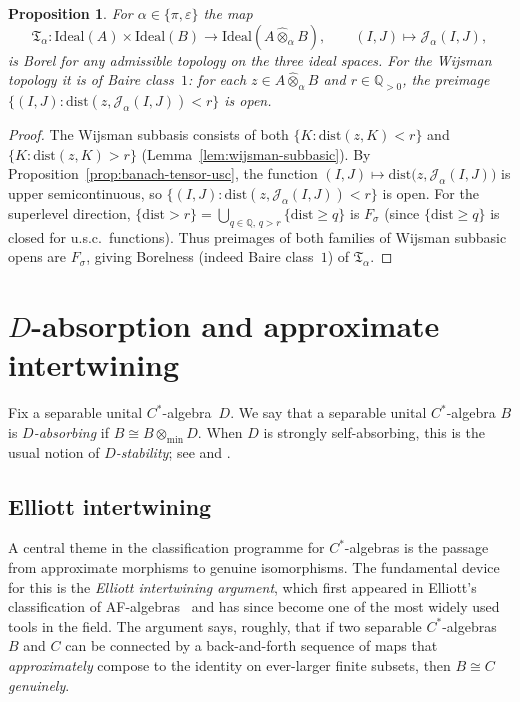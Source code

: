 \documentclass[12pt,fleqn,a4paper]{amsart}
\renewcommand{\ge}{\geqslant}
\numberwithin{equation}{section}
\newtheorem{proposition}[theorem]{Proposition}
\theoremstyle{definition}
\newcommand{\Q}{\mathbb{Q}}
\newcommand{\Ideal}{\mathrm{Ideal}}
\newcommand{\dist}{\mathrm{dist}}
\begin{document}
\begin{proposition}\label{prop:banach-tensor-borel}
For $\alpha\in\{\pi,\varepsilon\}$ the map
\[
\mathfrak T_\alpha:\Ideal(A)\times\Ideal(B)\to \Ideal(A\widehat\otimes_\alpha B),
\qquad (I,J)\mapsto \mathcal J_\alpha(I,J),
\]
is Borel for any admissible topology on the three ideal spaces.
For the Wijsman topology it is of Baire class~$1$:
for each $z\in A\widehat\otimes_\alpha B$ and $r\in\Q_{>0}$, the preimage
$\{(I,J):\dist(z,\mathcal J_\alpha(I,J))<r\}$ is open.
\end{proposition}

\begin{proof}
The Wijsman subbasis consists of both $\{K:\dist(z,K)<r\}$ and
$\{K:\dist(z,K)>r\}$ (Lemma~\ref{lem:wijsman-subbasic}).
By Proposition~\ref{prop:banach-tensor-usc}, the function
$(I,J)\mapsto \dist\bigl(z,\mathcal J_\alpha(I,J)\bigr)$ is upper semicontinuous, so
$\{(I,J):\dist(z,\mathcal J_\alpha(I,J))<r\}$ is open.
For the superlevel direction, $\{\dist>r\}=\bigcup_{q\in\Q,\,q>r}\{\dist\ge q\}$
is $F_\sigma$ (since $\{\dist\ge q\}$ is closed for u.s.c.\ functions).
Thus preimages of both families of Wijsman subbasic opens are $F_\sigma$,
giving Borelness (indeed Baire class~$1$) of $\mathfrak T_\alpha$.
\end{proof}

\section{\texorpdfstring{$D$}{D}-absorption and approximate intertwining}\label{sec:D-stability}

Fix a separable unital $C^*$-algebra~$D$.  We say that a separable unital
$C^*$-algebra $B$ is \emph{$D$-absorbing} if
$B\cong B\otimes_{\min}D$.  When $D$ is strongly self-absorbing, this is the
usual notion of \emph{$D$-stability}; see \cite[II.8.5.1]{BlackadarOA}
and \cite{TomsWinter}.

\subsection{Elliott intertwining}\label{subsec:elliott}

A central theme in the classification programme for $C^*$-algebras is the passage from
approximate morphisms to genuine isomorphisms.  The fundamental device for this is the
\emph{Elliott intertwining argument}, which first appeared in
Elliott's classification of AF-algebras~\cite{Elliott1976} and has since become one of
the most widely used tools in the field.  The argument says, roughly, that if two
separable $C^*$-algebras $B$ and $C$ can be connected by a back-and-forth sequence of
maps that \emph{approximately} compose to the identity on ever-larger finite subsets,
then $B\cong C$ \emph{genuinely}.
\end{document}
